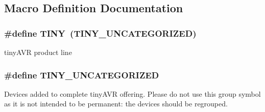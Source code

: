 \subsection{Macro Definition Documentation}
\hypertarget{group__tiny__part__macros__group_gacf1c38f71f39386356edb151a131ad11}{
\subsubsection[{T\-I\-N\-Y}]{\setlength{\rightskip}{0pt plus 5cm}\#define T\-I\-N\-Y~({\bf T\-I\-N\-Y\-\_\-\-U\-N\-C\-A\-T\-E\-G\-O\-R\-I\-Z\-E\-D})}}\label{group__tiny__part__macros__group_gacf1c38f71f39386356edb151a131ad11}
tiny\-A\-V\-R product line \hypertarget{group__tiny__part__macros__group_ga82ec23e0742b1f94e206d669f5d18f34}{
\subsubsection[{T\-I\-N\-Y\-\_\-\-U\-N\-C\-A\-T\-E\-G\-O\-R\-I\-Z\-E\-D}]{\setlength{\rightskip}{0pt plus 5cm}\#define T\-I\-N\-Y\-\_\-\-U\-N\-C\-A\-T\-E\-G\-O\-R\-I\-Z\-E\-D}}\label{group__tiny__part__macros__group_ga82ec23e0742b1f94e206d669f5d18f34}
Devices added to complete tiny\-A\-V\-R offering. Please do not use this group symbol as it is not intended to be permanent\-: the devices should be regrouped. 